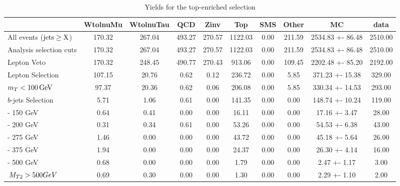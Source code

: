\begin{table}[!htb]
\setlength{\tabcolsep}{2pt}
\small
\begin{center} 

\begin{tabular}{lccccccccc} 
\hline\hline
& WtolnuMu& WtolnuTau& QCD& Zinv& Top& SMS& Other& MC& data \\ \hline \hline
 All events ($\rm jets\geq X$) & 170.32  & 267.04  & 493.27  & 270.57  & 1122.03  & 0.00 & 211.59  & 2534.83 +- 86.48 & 2510.00  \\ 
Analysis selection cuts & 170.32  & 267.04  & 493.27  & 270.57  & 1122.03  & 0.00 & 211.59  & 2534.83 +- 86.48 & 2510.00  \\ 

Lepton Veto & 170.32  & 248.45  & 490.77  & 270.43  & 913.06  & 0.00 & 109.45  & 2202.48 +- 85.20 & 2192.00  \\ 
Lepton Selection & 107.15  & 20.76  & 0.62  & 0.12  & 236.72  & 0.00 & 5.85  & 371.23 +- 15.38 & 329.00  \\ 
$m_T < 100\, \rm GeV$ & 97.37  & 20.36  & 0.62  & 0.06  & 206.08  & 0.00 & 5.85  & 330.34 +- 14.53 & 293.00  \\
$b$-jets Selection & 5.71  & 1.06  & 0.61  & 0.00  & 141.35  & 0.00 & 0.00  & 148.74 +- 10.24 & 119.00  \\  
\mttwo  100 - 150 GeV & 0.64  & 0.41  & 0.00  & 0.00  & 16.11  & 0.00 & 0.00  & 17.16 +- 3.47 & 28.00  \\ 
\mttwo  150 - 200 GeV & 0.31  & 0.34  & 0.61  & 0.00  & 53.26  & 0.00 & 0.00  & 54.53 +- 6.38 & 43.00  \\ 
\mttwo  200 - 275 GeV & 1.46  & 0.00  & 0.00  & 0.00  & 43.72  & 0.00 & 0.00  & 45.18 +- 5.64 & 26.00  \\ 
\mttwo  275 - 375 GeV & 1.94  & 0.00  & 0.00  & 0.00  & 24.37  & 0.00 & 0.00  & 26.30 +- 4.14 & 16.00  \\ 
\mttwo  375 - 500 GeV & 0.68  & 0.00  & 0.00  & 0.00  & 1.79  & 0.00 & 0.00  & 2.47 +- 1.17 & 3.00  \\ 
$\,{M_{T2}} > 500 GeV$ & 0.69  & 0.30  & 0.00  & 0.00  & 1.30  & 0.00  & 0.00  & 2.29 +- 1.10 & 2.00  \\
\hline\hline 
\end{tabular} 
\caption{Yields for the top-enriched selection}
\label{tab:toEnrichyields}
\end{center} 
\end{table}


